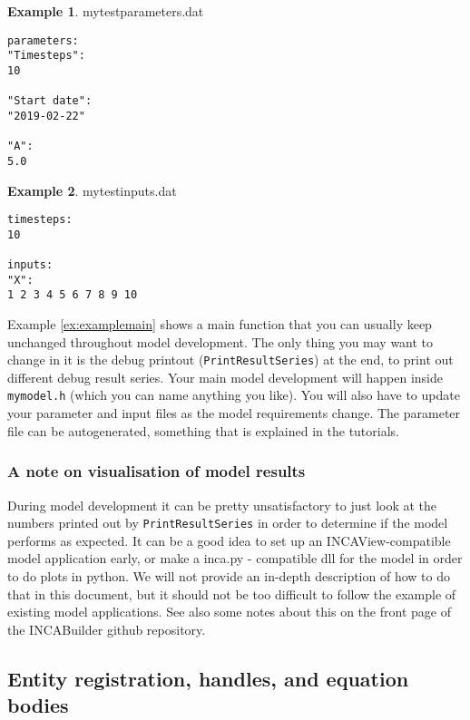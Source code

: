 \documentclass[11pt]{article}
\theoremstyle{definition}
\newtheorem{myexample}{Example}
\newenvironment{example}%
  {\begin{lrbox}{\examplebox}%
   \begin{minipage}{\dimexpr\linewidth-2\fboxsep}
   \begin{myexample}}%
  {\end{myexample}%
   \end{minipage}%
   \end{lrbox}%
   \begin{trivlist}
     \item[]\colorbox{silver}{\usebox\examplebox}
   \end{trivlist}}
\begin{document}
\begin{example}
mytestparameters.dat
\begin{lstlisting}[style=textstyle]
parameters:
"Timesteps":
10

"Start date":
"2019-02-22"

"A":
5.0
\end{lstlisting}
\end{example}

\begin{example}
mytestinputs.dat
\begin{lstlisting}[style=textstyle]
timesteps:
10

inputs:
"X":
1 2 3 4 5 6 7 8 9 10
\end{lstlisting}
\end{example}

Example \ref{ex:examplemain} shows a main function that you can usually keep unchanged throughout model development. The only thing you may want to change in it is the debug printout ({\tt PrintResultSeries}) at the end, to print out different debug result series. Your main model development will happen inside {\tt mymodel.h} (which you can name anything you like). You will also have to update your parameter and input files as the model requirements change. The parameter file can be autogenerated, something that is explained in the tutorials.

\subsubsection{A note on visualisation of model results}

During model development it can be pretty unsatisfactory to just look at the numbers printed out by {\tt PrintResultSeries} in order to determine if the model performs as expected. It can be a good idea to set up an INCAView-compatible model application early, or make a inca.py - compatible dll for the model in order to do plots in python. We will not provide an in-depth description of how to do that in this document, but it should not be too difficult to follow the example of existing model applications. See also some notes about this on the front page of the INCABuilder github repository.

\subsection{Entity registration, handles, and equation bodies}\label{sec:registrationandhandles}
\end{document}
